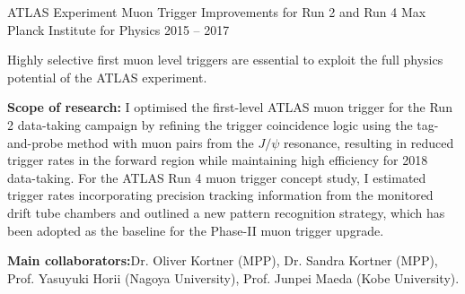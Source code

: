 \begin{cventries}
  \cventry
    {ATLAS Experiment} %
    {Muon Trigger Improvements for Run 2 and Run 4} %
    {Max Planck Institute for Physics} %
    {2015 -- 2017} %
  {
    \begin{cvitems} %
      \item {Highly selective first muon level triggers are essential to exploit the full physics potential of the ATLAS experiment.}
      \item \textbf{Scope of research:} I optimised the first-level ATLAS muon trigger for the Run 2 data-taking
      campaign by refining the trigger coincidence logic using the tag-and-probe method with muon
      pairs from the \(J/\psi\) resonance, resulting in reduced trigger rates in the forward region while
      maintaining high efficiency for 2018 data-taking. For the ATLAS Run 4 muon trigger concept
      study, I estimated trigger rates incorporating precision tracking information from the
      monitored drift tube chambers and outlined a new pattern recognition strategy, which has been
      adopted as the baseline for the Phase-II muon trigger upgrade.
      \item \textbf{Main collaborators:}Dr. Oliver Kortner (MPP), Dr. Sandra Kortner (MPP), Prof. Yasuyuki Horii (Nagoya University), Prof. Junpei Maeda (Kobe University).
    \end{cvitems}
  }
\end{cventries}
